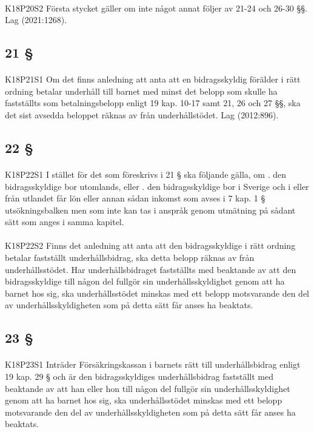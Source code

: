 \documentclass[a4paper,notitlepage,openany,10pt]{book}
\begin{document}
\paragraph*{}
{\tiny K18P20S2}
Första stycket gäller om inte något annat följer av 21-24 och 26-30 §§.
Lag (2021:1268).
\subsection*{21 §}
\paragraph*{}
{\tiny K18P21S1}
Om det finns anledning att anta att en bidragsskyldig förälder i rätt ordning betalar underhåll till barnet med minst det belopp som skulle ha fastställts som betalningsbelopp enligt 19 kap. 10-17 samt 21, 26 och 27 §§, ska det sist avsedda beloppet räknas av från underhållstödet.
Lag (2012:896).
\subsection*{22 §}
\paragraph*{}
{\tiny K18P22S1}
I stället för det som föreskrivs i 21 § ska följande gälla, om
. den bidragsskyldige bor utomlands, eller
. den bidragsskyldige bor i Sverige och i eller från utlandet får lön eller annan sådan inkomst som avses i 7 kap. 1 § utsökningsbalken men som inte kan tas i anspråk genom utmätning på sådant sätt som anges i samma kapitel.
\paragraph*{}
{\tiny K18P22S2}
Finns det anledning att anta att den bidragsskyldige i rätt ordning betalar fastställt underhållsbidrag, ska detta belopp räknas av från underhållsstödet. Har underhållsbidraget fastställts med beaktande av att den bidragsskyldige till någon del fullgör sin underhållsskyldighet genom att ha barnet hos sig, ska underhållsstödet minskas med ett belopp motsvarande den del av underhållsskyldigheten som på detta sätt får anses ha beaktats.
\subsection*{23 §}
\paragraph*{}
{\tiny K18P23S1}
Inträder Försäkringskassan i barnets rätt till underhållsbidrag enligt 19 kap. 29 § och är den bidragsskyldiges underhållsbidrag fastställt med beaktande av att han eller hon till någon del fullgör sin underhållsskyldighet genom att ha barnet hos sig, ska underhållsstödet minskas med ett belopp motsvarande den del av underhållsskyldigheten som på detta sätt får anses ha beaktats.
\end{document}
